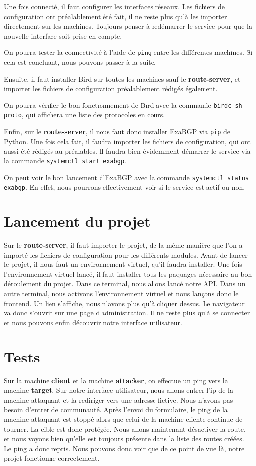 Une fois connecté, il faut configurer les interfaces réseaux. Les fichiers de configuration ont préalablement été fait, il ne reste plus qu'à les importer directement sur les machines.
Toujours penser à redémarrer le service pour que la nouvelle interface soit prise en compte.

On pourra tester la connectivité à l'aide de \verb+ping+ entre les différentes machines.
Si cela est concluant, nous pouvons passer à la suite.

Ensuite, il faut installer Bird sur toutes les machines sauf le \textbf{route-server}, et importer les fichiers de configuration préalablement rédigés également.

On pourra vérifier le bon fonctionnement de Bird avec la commande \verb+birdc sh proto+, qui affichera une liste des protocoles en cours.

Enfin, sur le \textbf{route-server}, il nous faut donc installer ExaBGP via \verb+pip+ de Python.
Une fois cela fait, il faudra importer les fichiers de configuration, qui ont aussi été rédigés au préalables.
Il faudra bien évidemment démarrer le service via la commande \verb+systemctl start exabgp+.

On peut voir le bon lancement d'ExaBGP avec la commande \verb+systemctl status exabgp+. En effet, nous pourrons effectivement voir si le service est actif ou non.

\section{Lancement du projet}

Sur le \textbf{route-server}, il faut importer le projet, de la même manière que l'on a importé les fichiers de configuration pour les différents modules.
Avant de lancer le projet, il nous faut un environnement virtuel, qu'il faudra installer.
Une fois l'environnement virtuel lancé, il faut installer tous les paquages nécessaire au bon déroulement du projet.
Dans ce terminal, nous allons lancé notre API.
Dans un autre terminal, nous activons l'environnement virtuel et nous lançons donc le frontend. Un lien s'affiche, nous n'avons plus qu'à cliquer dessus. Le navigateur va donc s'ouvrir sur une page d'administration.
Il ne reste plus qu'à se connecter et nous pouvons enfin découvrir notre interface utilisateur.

\section{Tests}
Sur la machine \textbf{client} et la machine \textbf{attacker}, on effectue un ping vers la machine \textbf{target}.
Sur notre interface utilisateur, nous allons entrer l'ip de la machine attaquant et la rediriger vers une adresse fictive. Nous n'avons pas besoin d'entrer de communauté.
Après l'envoi du formulaire, le ping de la machine attaquant est stoppé alors que celui de la machine cliente continue de tourner.
La cible est donc protégée.
Nous allons maintenant désactiver la route, et nous voyons bien qu'elle est toujours présente dans la liste des routes créées. Le ping a donc repris.
Nous pouvons donc voir que de ce point de vue là, notre projet fonctionne correctement.

